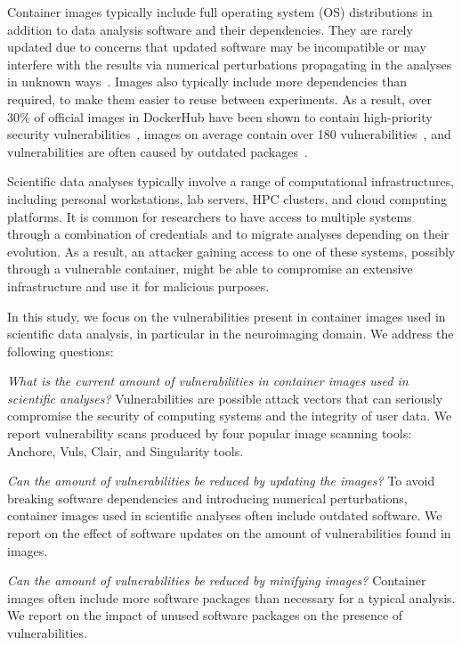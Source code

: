 \documentclass[a4paper,num-refs]{oup-contemporary}
\newcommand{\revision}[1]{\color{ao(english)}#1\color{black}\xspace}
\begin{document}
Container images typically include full operating system (OS) distributions
in addition to data analysis software and their dependencies. They are
rarely updated due to concerns that \revision{updated} software may \revision{be
incompatible or may} interfere with the
results \revision{via numerical perturbations propagating in the
analyses in unknown ways}~\cite{gronenschild2012effects, glatard2015reproducibility}.
Images also typically include more dependencies than required, to make them
easier to reuse between experiments. As a result, over 30\% of official
images in DockerHub have been shown to contain high-priority security
vulnerabilities~\cite{gummaraju2015over}, images on average contain over
180 vulnerabilities~\cite{Shu2017}, and vulnerabilities are often caused by
outdated packages~\cite{zerouali2019relation}.

\revision{Scientific data analyses typically involve a range of computational 
infrastructures, including personal workstations, lab servers, HPC clusters, 
and cloud computing platforms. It is common for researchers to have access
 to multiple systems through a combination of credentials and to migrate
  analyses depending on their evolution. As a result, an attacker gaining 
  access to one of these systems, possibly through a vulnerable container, 
  might be able to compromise an extensive infrastructure and use it for malicious purposes.}

In this study, we focus on the vulnerabilities present in container images
\revision{used in} scientific data analysis, in particular in the
neuroimaging domain. We address the following questions:

\textit{What is the current amount of vulnerabilities in
container images \revision{used in scientific analyses}?} Vulnerabilities are possible
attack vectors that can seriously compromise the security of \revision{computing systems}
and the integrity of user data. We report vulnerability scans produced
by four popular image scanning tools: Anchore, Vuls, Clair, and Singularity tools.

\textit{Can the amount of vulnerabilities be reduced by updating the images?}  
\revision{To avoid breaking software dependencies and introducing numerical
 perturbations, container images used in scientific analyses often include
 outdated software}. We report
on the effect of software updates on the amount of
vulnerabilities found in images.

\textit{Can the amount of vulnerabilities be reduced by minifying images?} 
Container images often include more software packages than necessary for 
a typical analysis. We report on the impact of unused software packages on
the presence of vulnerabilities.
\end{document}
